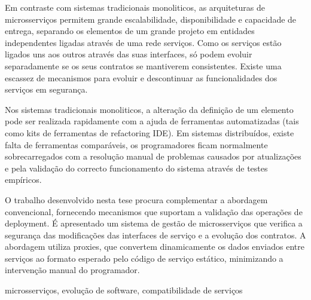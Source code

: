 
%

Em contraste com sistemas tradicionais monoliticos, as arquiteturas de microsserviços
permitem grande escalabilidade, disponibilidade e capacidade de entrega, separando os
elementos de um grande projeto em entidades independentes ligadas através de uma rede
serviços. Como os serviços estão ligados uns aos outros através das suas interfaces, só
podem evoluir separadamente se os seus contratos se mantiverem consistentes.
Existe uma escassez de mecanismos para evoluir e descontinuar as
funcionalidades dos serviços em segurança.

Nos sistemas tradicionais monoliticos, a alteração da definição de um elemento pode ser
realizada rapidamente com a ajuda de ferramentas automatizadas (tais como kits de
ferramentas de refactoring IDE). Em sistemas distribuídos, existe falta de ferramentas
comparáveis, os programadores ficam normalmente
sobrecarregados com a resolução manual de problemas causados por atualizações e pela
validação do correcto funcionamento do sistema através de testes empíricos.

O trabalho desenvolvido nesta tese procura complementar a abordagem convencional,
fornecendo mecanismos que suportam a validação das operações de deployment. É
apresentado um sistema de gestão de microsserviços que verifica a segurança das
modificações das interfaces de serviço e a evolução dos contratos. A abordagem utiliza proxies,
que convertem dinamicamente os dados enviados entre serviços ao formato esperado pelo
código de serviço estático, minimizando a intervenção manual do programador.

\begin{keywords}
    microsserviços, evolução de software, compatibilidade de serviços
\end{keywords}
